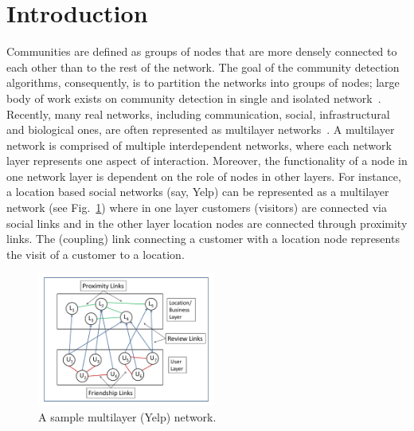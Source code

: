 \section{Introduction}
\label{intro}

Communities are defined as groups of nodes that are more densely connected to each other than to the rest
of the network. The goal of the community detection algorithms, consequently, is to partition the networks
into groups of nodes; large body of work exists on community detection in single and isolated
network~\cite{fortunato2010community}. Recently, many real networks, including communication, social,
infrastructural and biological
ones, are often represented as multilayer networks~\cite{buldyrev2010catastrophic}.
A multilayer network is comprised of multiple interdependent networks, where each network layer represents one
aspect of interaction. Moreover, the functionality of a node in one network layer is dependent on the role of nodes in other layers.
For instance, a location based social networks (say, Yelp) can be represented as a multilayer network (see Fig.~\ref{yelp}) where in
one layer customers (visitors) are connected via social links and in the other layer location nodes are connected through proximity links.
The (coupling) link connecting a customer with a location node represents the visit of a customer to a location.
\begin{figure}
\centering
\includegraphics[width=2.3in]{./images/yelp_data.pdf}
\vspace{-0.1in}
\caption{A sample multilayer (Yelp) network.}
\vspace{-0.23in}
\label{yelp}
\end{figure}






